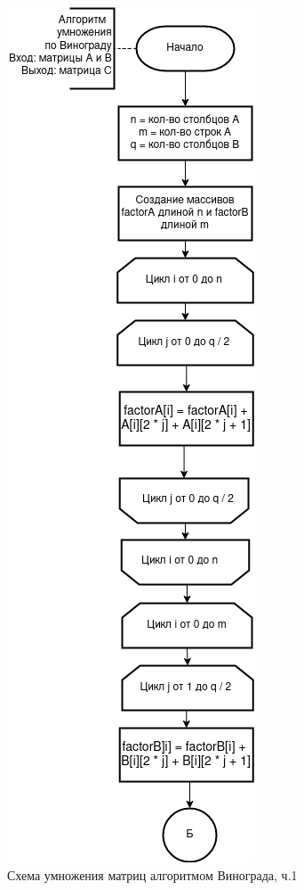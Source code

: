 \documentclass[12pt]{report}
\begin{document}
	\begin{figure}[H]
		\centering
		\includegraphics[width=0.38\linewidth]{vin_1}
		\caption{Схема умножения матриц алгоритмом Винограда, ч.1}
		\label{fig:schema_bucket_2}
	\end{figure}
	
\end{document}
